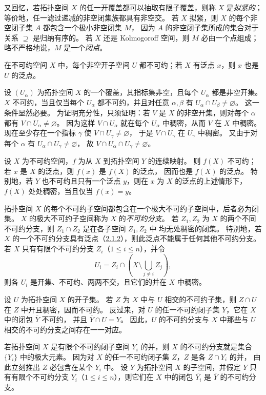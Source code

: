 又回忆，若拓扑空间 $X$ 的任一开覆盖都可以抽取有限子覆盖，则称 $X$ 是\emph{拟紧的}；
等价地，任一滤过递减的非空闭集族都具有非空交。
若 $X$ 拟紧，则 $X$ 的每个非空闭子集 $A$ 都包含一个极小非空闭集 $M$，
因为 $A$ 的非空闭子集所成的集合对于关系 $\supseteq$ 是归纳有序的。
若 $X$ 还是 Kolmogoroff 空间，则 $M$ 必由一个点组成；略不严格地说，$M$ 是一个\emph{闭点}。

在不可约空间 $X$ 中，每个非空开子空间 $U$ 都不可约；若 $X$ 有泛点 $x$，则 $x$ 也是 $U$ 的泛点。

设 $(U_\alpha)$ 为拓扑空间 $X$ 的一个覆盖，其指标集非空，且每个 $U_\alpha$ 都是非空开集。
$X$ 不可约，当且仅当每个 $U_\alpha$ 都不可约，并且对任意 $\alpha,\beta$ 有
$U_\alpha\cap U_\beta\ne\varnothing$。
这一条件显然必要。
为证明充分性，只须证明：若 $V$ 是 $X$ 的非空开集，则对每个 $\alpha$ 都有
$V\cap U_\alpha\ne\varnothing$。
因为这样 $V\cap U_\alpha$ 就在每个 $U_\alpha$ 中稠密，从而 $V$ 在 $X$ 中稠密。
现在至少存在一个指标 $\gamma$ 使 $V\cap U_\gamma\ne\varnothing$，
于是 $V\cap U_\gamma$ 在 $U_\gamma$ 中稠密。
又由于对每个 $\alpha$ 有 $U_\alpha\cap U_\gamma\ne\varnothing$，
故 $V\cap U_\alpha\cap U_\gamma\ne\varnothing$。

设 $X$ 为不可约空间，$f$ 为从 $X$ 到拓扑空间 $Y$ 的连续映射。
则 $f(X)$ 不可约；若 $x$ 是 $X$ 的泛点，则 $f(x)$ 是 $f(X)$ 的泛点，
因而也是 $\overline{f(X)}$ 的泛点。
特别地，若 $Y$ 也不可约且只有一个泛点 $y$，则在 $x$ 为 $X$ 的泛点的上述情形下，
$f(X)$ 处处稠密，当且仅当 $f(x)=y$。

拓扑空间 $X$ 的每个不可约子空间都包含在一个极大不可约子空间中，后者必为闭集。
$X$ 的极大不可约子空间称为 $X$ 的\emph{不可约分支}。
若 $Z_1,Z_2$ 为 $X$ 的两个不同不可约分支，则 $Z_1\cap Z_2$ 是在各子空间 $Z_1,Z_2$ 中
均无处稠密的闭集。
特别地，若 $X$ 的一个不可约分支具有泛点（\hyperlink{para:0:2.1.2}{2.1.2}），则此泛点不能属于任何其他不可约分支。
若 $X$ 只有有限个不可约分支 $Z_i$（$1\le i\le n$），并令
\[
 U_i=Z_i\cap\left(X\setminus\bigcup_{j\ne i}Z_j\right),
\]
则各 $U_i$ 是开集、不可约、两两不交，且它们的并在 $X$ 中稠密。

设 $U$ 为拓扑空间 $X$ 的开子集。
若 $Z$ 为 $X$ 中与 $U$ 相交的不可约子集，则 $Z\cap U$ 在 $Z$ 中开且稠密，因而不可约。
反过来，对 $U$ 的任一不可约闭子集 $Y$，它在 $X$ 中的闭包 $\overline Y$ 不可约，
并且 $\overline Y\cap U=Y$。
因此，$U$ 的不可约分支与 $X$ 中那些与 $U$ 相交的不可约分支之间存在一一对应。

若拓扑空间 $X$ 是有限个不可约闭子空间 $Y_i$ 的并，则 $X$ 的不可约分支就是集合
$\{Y_i\}$ 中的极大元素。
因为对 $X$ 的任一不可约闭子集 $Z$，$Z$ 是各 $Z\cap Y_i$ 的并，
由此立刻推出 $Z$ 必包含在某个 $Y_i$ 中。
设 $Y$ 为拓扑空间 $X$ 的子空间，并假定 $Y$ 只有有限个不可约分支
$Y_i$（$1\le i\le n$），则它们在 $X$ 中的闭包 $\overline{Y_i}$ 是 $\overline Y$ 的不可约分支。

